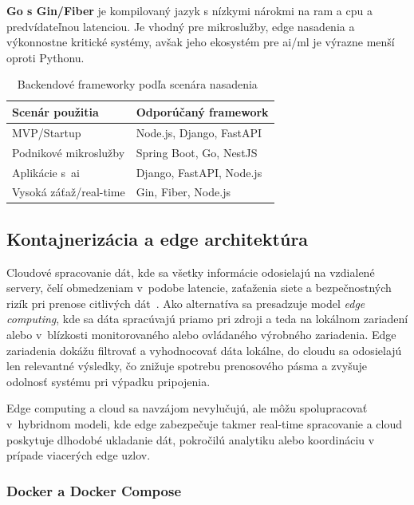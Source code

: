 \textbf{Go s Gin/Fiber} je kompilovaný jazyk s nízkymi nárokmi na \acrshort{ram} a \acrshort{cpu} a predvídateľnou
latenciou. Je vhodný pre mikroslužby, edge nasadenia a výkonnostne
kritické systémy, avšak jeho ekosystém pre \acrshort{ai}/\acrshort{ml} je výrazne
menší oproti Pythonu.

\begin{table}[h]
      \centering
      \caption{Backendové frameworky podľa scenára nasadenia~\cite{t09}}
      \label{tab:backend_frameworks}
      \begin{tabular}{ll}
            \hline
            \textbf{Scenár použitia}  & \textbf{Odporúčaný framework} \\
            \hline
            MVP/Startup               & Node.js, Django, FastAPI      \\
            Podnikové mikroslužby     & Spring Boot, Go, NestJS       \\
            Aplikácie s~\acrshort{ai} & Django, FastAPI, Node.js      \\
            Vysoká záťaž/real-time    & Gin, Fiber, Node.js           \\
            \hline
      \end{tabular}
\end{table}

\subsection{Kontajnerizácia a edge architektúra}

Cloudové spracovanie dát, kde sa všetky informácie odosielajú na vzdialené
servery, čelí obmedzeniam v~podobe latencie, zaťaženia siete a bezpečnostných
rizík pri prenose citlivých dát~\cite{t10}. Ako alternatíva sa presadzuje model
\textit{edge computing}, kde sa dáta spracúvajú priamo pri zdroji a teda na
lokálnom zariadení alebo v~blízkosti monitorovaného alebo ovládaného
výrobného zariadenia. Edge zariadenia dokážu filtrovať a vyhodnocovať dáta lokálne, do
cloudu sa odosielajú len relevantné výsledky, čo znižuje spotrebu prenosového
pásma a zvyšuje odolnosť systému pri výpadku pripojenia.

Edge computing a cloud sa navzájom nevylučujú, ale môžu spolupracovať
v~hybridnom modeli, kde edge zabezpečuje takmer real-time spracovanie a cloud
poskytuje dlhodobé ukladanie dát, pokročilú analytiku alebo koordináciu v
prípade viacerých edge uzlov.

\subsubsection{Docker a Docker Compose}

